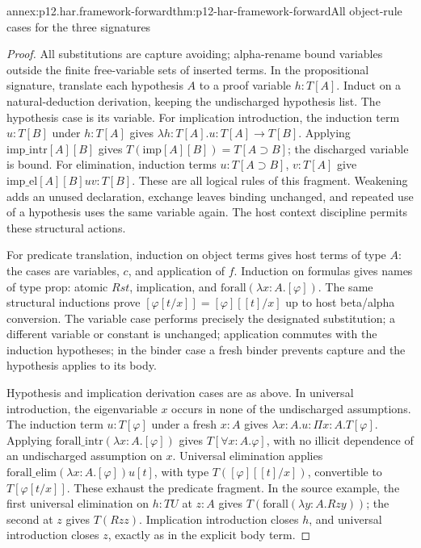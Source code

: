 \begin{annexitem}{annex:p12.har.framework-forward}{thm:p12-har-framework-forward}{All object-rule cases for the three signatures}
\begin{proof}
All substitutions are capture avoiding; alpha-rename bound variables
outside the finite free-variable sets of inserted terms. In the
propositional signature, translate each hypothesis \(A\) to a proof
variable \(h:T[A]\). Induct on a natural-deduction derivation, keeping
the undischarged hypothesis list. The hypothesis case is its variable.
For implication introduction, the induction term \(u:T[B]\) under
\(h:T[A]\) gives \(\lambda h:T[A].u:T[A]\to T[B]\).
Applying \(\mathrm{imp\_intr}[A][B]\) gives
\(T(\mathrm{imp}[A][B])=T[A\supset B]\); the discharged
variable is bound. For elimination, induction terms
\(u:T[A\supset B]\), \(v:T[A]\) give
\(\mathrm{imp\_el}[A][B]uv:T[B]\). These are all logical
rules of this fragment. Weakening adds an unused declaration, exchange
leaves binding unchanged, and repeated use of a hypothesis uses the same
variable again. The host context discipline permits these structural actions.

For predicate translation, induction on object terms gives host terms of
type \(A\): the cases are variables, \(c\), and application of
\(f\). Induction on formulas gives names of type \(\mathrm{prop}\):
atomic \(Rst\), implication, and
\(\mathrm{forall}(\lambda x:A.[\varphi])\).
The same structural inductions prove
\([\varphi[t/x]]=[\varphi][[t]/x]\) up to host beta/alpha
conversion. The variable case performs precisely the designated
substitution; a different variable or constant is unchanged; application
commutes with the induction hypotheses; in the binder case a fresh
binder prevents capture and the hypothesis applies to its body.

Hypothesis and implication derivation cases are as above. In universal
introduction, the eigenvariable \(x\) occurs in none of the
undischarged assumptions. The induction term \(u:T[\varphi]\)
under a fresh \(x:A\) gives
\(\lambda x:A.u:\Pi x:A.T[\varphi]\). Applying
\(\mathrm{forall\_intr}(\lambda x:A.[\varphi])\) gives
\(T[\forall x:A.\varphi]\), with no illicit dependence of an
undischarged assumption on \(x\). Universal elimination applies
\(\mathrm{forall\_elim}(\lambda x:A.[\varphi])u[t]\), with
type \(T([\varphi][[t]/x])\), convertible to
\(T[\varphi[t/x]]\). These exhaust the predicate fragment.
In the source example, the first universal elimination on \(h:T U\)
at \(z:A\) gives \(T(\mathrm{forall}(\lambda y:A.Rzy))\);
the second at \(z\) gives \(T(Rzz)\). Implication introduction
closes \(h\), and universal introduction closes \(z\), exactly
as in the explicit body term.


\end{proof}
\end{annexitem}
